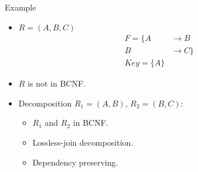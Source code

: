 \documentclass{beamer}
\begin{document}
\begin{frame}{Example}
    \begin{itemize}
        \item $R = (A, B, C)$
            \begin{equation*}
                \begin{align*}
                    F = \{ A &\rightarrow B \\
                            B &\rightarrow C \} \\
                    Key = \{ A \}
                \end{align*}
            \end{equation*}
        \item $R$ is not in BCNF.
        \item Decomposition $R_1 = (A, B)$, $R_2 = (B, C)$:
            \begin{itemize}
                \item $R_1$ and $R_2$ in BCNF.
                \item Lossless-join decomposition.
                \item Dependency preserving.
            \end{itemize}
    \end{itemize}
\end{frame}





\begin{frame}{}
\end{frame}

\end{document}
